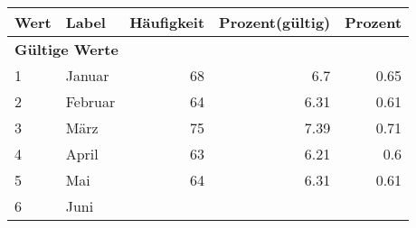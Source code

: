      \begin{longtable}{lXrrr}
     \toprule
     \textbf{Wert} & \textbf{Label} & \textbf{Häufigkeit} & \textbf{Prozent(gültig)} & \textbf{Prozent} \\
     \endhead
     \midrule
     \multicolumn{5}{l}{\textbf{Gültige Werte}}\\

     1 &
     \multicolumn{1}{X}{ Januar   } &


       \num{68} &
       \num[round-mode=places,round-precision=2]{6.7} &
         \num[round-mode=places,round-precision=2]{0.65} \\

     2 &
     \multicolumn{1}{X}{ Februar   } &


       \num{64} &
       \num[round-mode=places,round-precision=2]{6.31} &
         \num[round-mode=places,round-precision=2]{0.61} \\

     3 &
     \multicolumn{1}{X}{ März   } &


       \num{75} &
       \num[round-mode=places,round-precision=2]{7.39} &
         \num[round-mode=places,round-precision=2]{0.71} \\

     4 &
     \multicolumn{1}{X}{ April   } &


       \num{63} &
       \num[round-mode=places,round-precision=2]{6.21} &
         \num[round-mode=places,round-precision=2]{0.6} \\

     5 &
     \multicolumn{1}{X}{ Mai   } &


       \num{64} &
       \num[round-mode=places,round-precision=2]{6.31} &
         \num[round-mode=places,round-precision=2]{0.61} \\

     6 &
     \multicolumn{1}{X}{ Juni   } &



\end{longtable}
